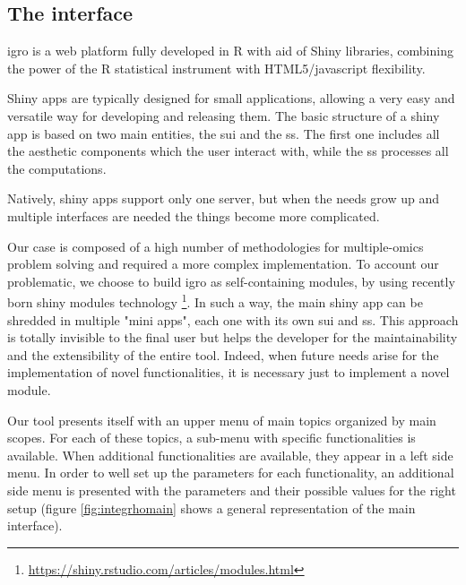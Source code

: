 \subsection{The interface}
\gls{igro} is a web platform fully developed in R with aid of Shiny libraries, combining the power of the R statistical instrument with HTML5/javascript flexibility.

Shiny apps are typically designed for small applications, allowing a very easy and versatile way for developing and releasing them.
The basic structure of a shiny app is based on two main entities, the \gls{sui} and the \gls{ss}.
The first one includes all the aesthetic components which the user interact with, while the \gls{ss} processes all the computations.

Natively, shiny apps support only one server, but when the needs grow up and multiple interfaces are needed the things become more complicated. 

Our case is composed of a high number of methodologies for multiple-omics problem solving and required a more complex implementation.
To account our problematic, we choose to build \gls{igro} as self-containing modules, by using recently born shiny modules technology \footnote{\url{https://shiny.rstudio.com/articles/modules.html}}.
In such a way, the main shiny app can be shredded in multiple "mini apps", each one with its own \gls{sui} and \gls{ss}.
This approach is totally invisible to the final user but helps the developer for the maintainability and the extensibility of the entire tool.
Indeed, when future needs arise for the implementation of novel functionalities, it is necessary just to implement a novel module.

Our tool presents itself with an upper menu of main topics organized by main scopes. 
For each of these topics, a sub-menu with specific functionalities is available.
When additional functionalities are available, they appear in a left side menu.
In order to well set up the parameters for each functionality, an additional side menu is presented with the parameters and their possible values for the right setup (figure \ref{fig:integrhomain} shows a general representation of the main interface).

